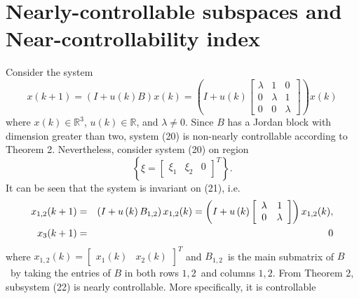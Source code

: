 \documentclass[journal,a4paper,12pt,onecolumn]{IEEEtran}
\begin{document}
$\left. {}\right. $

\section{Nearly-controllable subspaces and Near-controllability index}

Consider the system\begin{equation}
x\left( k+1\right) =\left( I+u\left( k\right) B\right) x\left( k\right)
=\left( I+u\left( k\right) \left[
\begin{array}{ccc}
\lambda & 1 & 0 \\
0 & \lambda & 1 \\
0 & 0 & \lambda \end{array}\right] \right) x\left( k\right)
\end{equation}where $x\left( k\right) \in
\mathbb{R}
^{3}$, $u\left( k\right) \in
\mathbb{R}
$, and $\lambda \neq 0$. Since $B$ has a Jordan block with dimension greater
than two, system (20) is non-nearly controllable according to Theorem 2.
Nevertheless, consider system (20) on region\begin{equation}
\left\{ \xi =\left[
\begin{array}{ccc}
\xi _{1} & \xi _{2} & 0\end{array}\right] ^{T}\right\} .
\end{equation}It can be seen that the system is invariant on (21), i.e.\begin{eqnarray}
x_{1,2}(k+1) &=&\left( I+u\left( k\right) B_{1,2}\right) x_{1,2}(k)=\left(
I+u\left( k\right) \left[
\begin{array}{cc}
\lambda & 1 \\
0 & \lambda \end{array}\right] \right) x_{1,2}(k), \\
x_{3}(k+1) &=&0  \notag
\end{eqnarray}where $x_{1,2}(k)=\left[
\begin{array}{cc}
x_{1}(k) & x_{2}(k)\end{array}\right] ^{T}$ and $B_{1,2}$\ is the main submatrix of $B$\ by taking the
entries of $B$ in both rows $1,2$\ and columns $1,2$. From Theorem 2,
subsystem (22) is nearly controllable. More specifically, it is controllable
\end{document}
